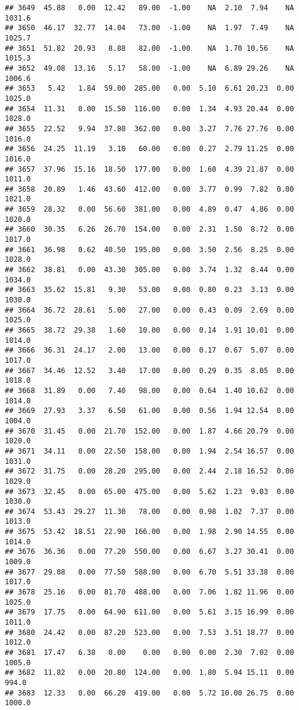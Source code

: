\documentclass{article}\usepackage{graphicx, color}
\makeatletter
\newenvironment{kframe}{%
 \def\at@end@of@kframe{}%
 \ifinner\ifhmode%
  \def\at@end@of@kframe{\end{minipage}}%
  \begin{minipage}{\columnwidth}%
 \fi\fi%
 \def\FrameCommand##1{\hskip\@totalleftmargin \hskip-\fboxsep
 \colorbox{shadecolor}{##1}\hskip-\fboxsep
     \hskip-\linewidth \hskip-\@totalleftmargin \hskip\columnwidth}%
 \MakeFramed {\advance\hsize-\width
   \@totalleftmargin\z@ \linewidth\hsize
   \@setminipage}}%
 {\par\unskip\endMakeFramed%
 \at@end@of@kframe}
\newenvironment{knitrout}{}{} %
\makeatother
\begin{document}
\begin{knitrout}
\begin{kframe}
\begin{verbatim}
## 3649  45.88   0.00  12.42   89.00  -1.00    NA  2.10  7.94    NA 1031.6
## 3650  46.17  32.77  14.04   73.00  -1.00    NA  1.97  7.49    NA 1025.7
## 3651  51.82  20.93   8.88   82.00  -1.00    NA  1.70 10.56    NA 1015.3
## 3652  49.08  13.16   5.17   58.00  -1.00    NA  6.89 29.26    NA 1006.6
## 3653   5.42   1.84  59.00  285.00   0.00  5.10  6.61 20.23  0.00 1025.0
## 3654  11.31   0.00  15.50  116.00   0.00  1.34  4.93 20.44  0.00 1028.0
## 3655  22.52   9.94  37.80  362.00   0.00  3.27  7.76 27.76  0.00 1016.0
## 3656  24.25  11.19   3.10   60.00   0.00  0.27  2.79 11.25  0.00 1016.0
## 3657  37.96  15.16  18.50  177.00   0.00  1.60  4.39 21.87  0.00 1011.0
## 3658  20.89   1.46  43.60  412.00   0.00  3.77  0.99  7.82  0.00 1021.0
## 3659  28.32   0.00  56.60  381.00   0.00  4.89  0.47  4.86  0.00 1020.0
## 3660  30.35   6.26  26.70  154.00   0.00  2.31  1.50  8.72  0.00 1017.0
## 3661  36.98   0.62  40.50  195.00   0.00  3.50  2.56  8.25  0.00 1028.0
## 3662  38.81   0.00  43.30  305.00   0.00  3.74  1.32  8.44  0.00 1034.0
## 3663  35.62  15.81   9.30   53.00   0.00  0.80  0.23  3.13  0.00 1030.0
## 3664  36.72  28.61   5.00   27.00   0.00  0.43  0.09  2.69  0.00 1025.0
## 3665  38.72  29.38   1.60   10.00   0.00  0.14  1.91 10.01  0.00 1014.0
## 3666  36.31  24.17   2.00   13.00   0.00  0.17  0.67  5.07  0.00 1017.0
## 3667  34.46  12.52   3.40   17.00   0.00  0.29  0.35  8.05  0.00 1018.0
## 3668  31.89   0.00   7.40   98.00   0.00  0.64  1.40 10.62  0.00 1014.0
## 3669  27.93   3.37   6.50   61.00   0.00  0.56  1.94 12.54  0.00 1004.0
## 3670  31.45   0.00  21.70  152.00   0.00  1.87  4.66 20.79  0.00 1020.0
## 3671  34.11   0.00  22.50  158.00   0.00  1.94  2.54 16.57  0.00 1031.0
## 3672  31.75   0.00  28.20  295.00   0.00  2.44  2.18 16.52  0.00 1029.0
## 3673  32.45   0.00  65.00  475.00   0.00  5.62  1.23  9.03  0.00 1030.0
## 3674  53.43  29.27  11.30   78.00   0.00  0.98  1.02  7.37  0.00 1013.0
## 3675  53.42  18.51  22.90  166.00   0.00  1.98  2.90 14.55  0.00 1014.0
## 3676  36.36   0.00  77.20  550.00   0.00  6.67  3.27 30.41  0.00 1009.0
## 3677  29.88   0.00  77.50  588.00   0.00  6.70  5.51 33.38  0.00 1017.0
## 3678  25.16   0.00  81.70  488.00   0.00  7.06  1.82 11.96  0.00 1025.0
## 3679  17.75   0.00  64.90  611.00   0.00  5.61  3.15 16.99  0.00 1011.0
## 3680  24.42   0.00  87.20  523.00   0.00  7.53  3.51 18.77  0.00 1012.0
## 3681  17.47   6.38   0.00    0.00   0.00  0.00  2.30  7.02  0.00 1005.0
## 3682  11.82   0.00  20.80  124.00   0.00  1.80  5.94 15.11  0.00  994.0
## 3683  12.33   0.00  66.20  419.00   0.00  5.72 10.00 26.75  0.00 1000.0

\end{verbatim}
\end{kframe}
\end{knitrout}
\end{document}
